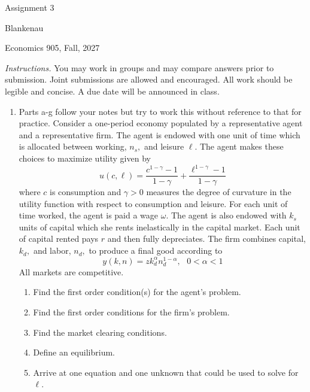 \documentclass[12pt]{article}
\begin{document}
\begin{center}
{\LARGE Assignment 3}
\end{center}

\noindent Blankenau

\noindent Economics 905, Fall, 2027

\medskip
\noindent \textit{Instructions.} You may work in groups and may compare
answers prior to submission. Joint submissions are allowed and encouraged.
All work should be legible and concise. A due date will be announced in
class.

\begin{enumerate}
\item Parts a-g follow your notes but try to work this without reference to
that for practice. Consider a one-period economy populated by a
representative agent and a representative firm. The agent is endowed with
one unit of time which is allocated between working, $n_{s},$ and leisure $%
\ell $. The agent makes these choices to maximize utility given by 
\begin{equation*}
u\left( c,\ell \right) =\frac{c^{1-\gamma }-1}{1-\gamma }+\frac{\ell
^{1-\gamma }-1}{1-\gamma }
\end{equation*}%
where $c$ is consumption and $\gamma >0$ measures the degree of curvature in
the utility function with respect to consumption and leisure. For each unit
of time worked, the agent is paid a wage $\omega $. The agent is also
endowed with $k_{s}$ units of capital which she rents inelastically in the
capital market. Each unit of capital rented pays $r$ and then fully
depreciates. The firm combines capital, $k_{d},$ and labor, $n_{d},$ to
produce a final good according to 
\begin{equation}
y\left( k,n\right) =zk_{d}^{\alpha }n_{d}^{1-\alpha },\text{ }0<\alpha <1
\label{out}
\end{equation}%
All markets are competitive.

\begin{enumerate}
\item Find the first order condition(s) for the agent's problem.

\item Find the first order conditions for the firm's problem.

\item Find the market clearing conditions.

\item Define an equilibrium.

\item Arrive at one equation and one unknown that could be used to solve for 
$\ell .$


\end{enumerate}
\end{enumerate}
\end{document}

